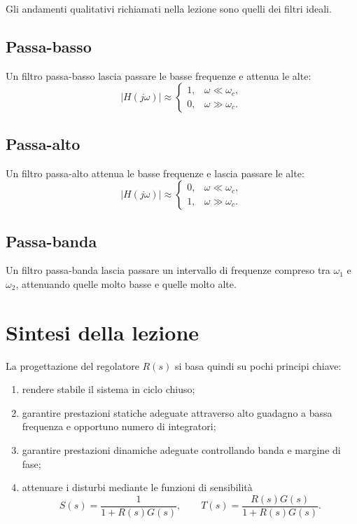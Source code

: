 Gli andamenti qualitativi richiamati nella lezione sono quelli dei filtri ideali.

\subsection{Passa-basso}

Un filtro passa-basso lascia passare le basse frequenze e attenua le alte:
\[
|H(j\omega)| \approx
\begin{cases}
1, & \omega \ll \omega_c,\\
0, & \omega \gg \omega_c.
\end{cases}
\]

\subsection{Passa-alto}

Un filtro passa-alto attenua le basse frequenze e lascia passare le alte:
\[
|H(j\omega)| \approx
\begin{cases}
0, & \omega \ll \omega_c,\\
1, & \omega \gg \omega_c.
\end{cases}
\]

\subsection{Passa-banda}

Un filtro passa-banda lascia passare un intervallo di frequenze compreso tra
\(\omega_1\) e \(\omega_2\), attenuando quelle molto basse e quelle molto alte.

\section{Sintesi della lezione}

La progettazione del regolatore \(R(s)\) si basa quindi su pochi principi chiave:
\begin{enumerate}
    \item rendere stabile il sistema in ciclo chiuso;
    \item garantire prestazioni statiche adeguate attraverso alto guadagno a bassa frequenza
    e opportuno numero di integratori;
    \item garantire prestazioni dinamiche adeguate controllando banda e margine di fase;
    \item attenuare i disturbi mediante le funzioni di sensibilità
    \[
    S(s)=\frac{1}{1+R(s)G(s)},\qquad
    T(s)=\frac{R(s)G(s)}{1+R(s)G(s)}.
    \]
\end{enumerate}